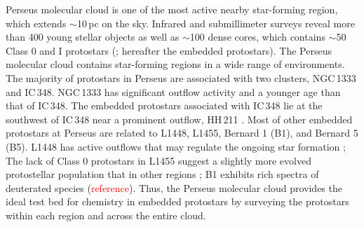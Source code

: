 \documentclass[twocolumn]{aastex62}
\newcommand{\refnote}{\textcolor{red}{reference}}
\begin{document}
Perseus molecular cloud is one of the most active nearby star-forming region, which extends $\sim$10\,pc on the sky.  Infrared and submillimeter surveys reveal more than 400 young stellar objects as well as $\sim$100 dense cores, which contains $\sim$50 Class 0 and I protostars (\citealt{2005A&A...440..151H,2008ApJ...683..822J,2013AJ....145...94D}; hereafter the embedded protostars).  The Perseus molecular cloud contains star-forming regions in a wide range of environments.  The majority of protostars in Perseus are associated with two clusters, NGC\,1333 and IC\,348.  NGC\,1333 has significant outflow activity \citep{2013ApJ...774...22P} and a younger age than that of IC\,348.  The embedded protostars associated with IC\,348 lie at the southwest of IC\,348 near a prominent outflow, HH\,211 \citep[e.g., ][]{2009ApJ...699.1584L}.  Most of other embedded protostars at Perseus are related to L1448, L1455, Bernard 1 (B1), and Bernard 5 (B5).  L1448 has active outflows that may regulate the ongoing star formation \citep{2010MNRAS.408.1516C}; The lack of Class 0 protostars in L1455 suggest a slightly more evolved protostellar population that in other regions \citep{2007A&A...468.1009H}; B1 exhibits rich spectra of deuterated species (\refnote).  Thus, the Perseus molecular cloud provides the ideal test bed for chemistry in embedded protostars by surveying the protostars within each region and across the entire cloud.
\end{document}

